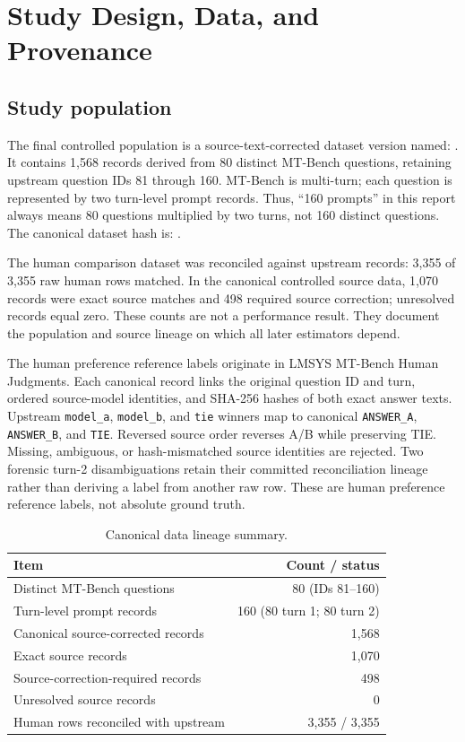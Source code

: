 \chapter{Study Design, Data, and Provenance}
\label{ch:design}

\section{Study population}

The final controlled population is a source-text-corrected dataset version named:
.
It contains 1,568 records derived from 80 distinct MT-Bench questions, retaining upstream question IDs 81 through 160. MT-Bench is multi-turn; each question is represented by two turn-level prompt records. Thus, ``160 prompts'' in this report always means 80 questions multiplied by two turns, not 160 distinct questions. The canonical dataset hash is:
\newline {\footnotesize \datasetsha}.

The human comparison dataset was reconciled against upstream records: 3,355 of 3,355 raw human rows matched. In the canonical controlled source data, 1,070 records were exact source matches and 498 required source correction; unresolved records equal zero. These counts are not a performance result. They document the population and source lineage on which all later estimators depend.

The human preference reference labels originate in LMSYS MT-Bench Human Judgments. Each canonical record links the original question ID and turn, ordered source-model identities, and SHA-256 hashes of both exact answer texts. Upstream \texttt{model\_a}, \texttt{model\_b}, and \texttt{tie} winners map to canonical \texttt{ANSWER\_A}, \texttt{ANSWER\_B}, and \texttt{TIE}. Reversed source order reverses A/B while preserving TIE. Missing, ambiguous, or hash-mismatched source identities are rejected. Two forensic turn-2 disambiguations retain their committed reconciliation lineage rather than deriving a label from another raw row. These are human preference reference labels, not absolute ground truth.

\begin{table}[H]
\centering
\caption{Canonical data lineage summary.}
\label{tab:data-lineage}
\begin{tabular}{lr}
\toprule
Item & Count / status \\
\midrule
Distinct MT-Bench questions & 80 (IDs 81--160)\\
Turn-level prompt records & 160 (80 turn 1; 80 turn 2)\\
Canonical source-corrected records & 1,568\\
Exact source records & 1,070\\
Source-correction-required records & 498\\
Unresolved source records & 0\\
Human rows reconciled with upstream & 3,355 / 3,355\\
\bottomrule
\end{tabular}
\end{table}

